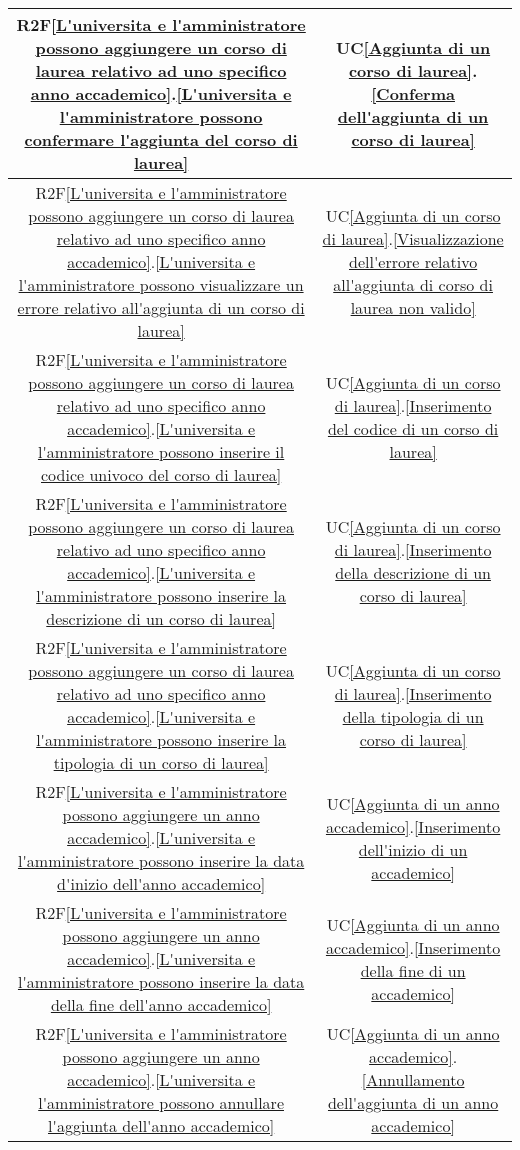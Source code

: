 \begin{longtable}{|c|c|}
\hline
R2F\ref{L'universita e l'amministratore possono aggiungere un corso di laurea relativo ad uno specifico anno accademico}.\ref{L'universita e l'amministratore possono confermare l'aggiunta del corso di laurea} & UC\ref{Aggiunta di un corso di laurea}.\ref{Conferma dell'aggiunta di un corso di laurea}\\
\hline
R2F\ref{L'universita e l'amministratore possono aggiungere un corso di laurea relativo ad uno specifico anno accademico}.\ref{L'universita e l'amministratore possono visualizzare un errore relativo all'aggiunta di un corso di laurea} & UC\ref{Aggiunta di un corso di laurea}.\ref{Visualizzazione dell'errore relativo all'aggiunta di corso di laurea non valido}\\
\hline
R2F\ref{L'universita e l'amministratore possono aggiungere un corso di laurea relativo ad uno specifico anno accademico}.\ref{L'universita e l'amministratore possono inserire il codice univoco del corso di laurea} & UC\ref{Aggiunta di un corso di laurea}.\ref{Inserimento del codice di un corso di laurea}\\
\hline
R2F\ref{L'universita e l'amministratore possono aggiungere un corso di laurea relativo ad uno specifico anno accademico}.\ref{L'universita e l'amministratore possono inserire la descrizione di un corso di laurea} & UC\ref{Aggiunta di un corso di laurea}.\ref{Inserimento della descrizione di un corso di laurea}\\
\hline
R2F\ref{L'universita e l'amministratore possono aggiungere un corso di laurea relativo ad uno specifico anno accademico}.\ref{L'universita e l'amministratore possono inserire la tipologia di un corso di laurea} & UC\ref{Aggiunta di un corso di laurea}.\ref{Inserimento della tipologia di un corso di laurea}\\
\hline
R2F\ref{L'universita e l'amministratore possono aggiungere un anno accademico}.\ref{L'universita e l'amministratore possono inserire la data d'inizio dell'anno accademico} & UC\ref{Aggiunta di un anno accademico}.\ref{Inserimento dell'inizio di un accademico}\\
\hline
R2F\ref{L'universita e l'amministratore possono aggiungere un anno accademico}.\ref{L'universita e l'amministratore possono inserire la data della fine dell'anno accademico} & UC\ref{Aggiunta di un anno accademico}.\ref{Inserimento della fine di un accademico}\\
\hline
R2F\ref{L'universita e l'amministratore possono aggiungere un anno accademico}.\ref{L'universita e l'amministratore possono annullare l'aggiunta dell'anno accademico} & UC\ref{Aggiunta di un anno accademico}.\ref{Annullamento dell'aggiunta di un anno accademico}\\

\end{longtable}
